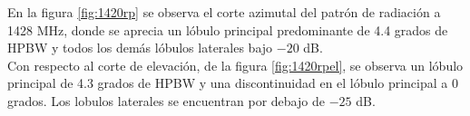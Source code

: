 



En la figura \ref{fig:1420rp} se observa el corte azimutal del patrón de radiación a 1428 MHz, donde se aprecia un lóbulo principal predominante de 4.4 grados de HPBW y todos los demás lóbulos laterales bajo $-20$ dB.\\


Con respecto al corte de elevación, de la figura \ref{fig:1420rpel}, se observa un lóbulo principal de 4.3 grados de HPBW y una discontinuidad en el lóbulo principal a 0 grados. Los lobulos laterales  se encuentran por debajo de $-25$ dB.\\


